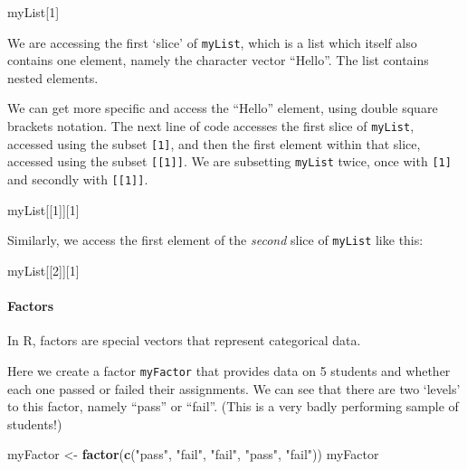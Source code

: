\documentclass[]{article}
\newenvironment{Shaded}{\begin{snugshade}}{\end{snugshade}}
\newcommand{\DecValTok}[1]{\textcolor[rgb]{0.00,0.00,0.81}{#1}}
\newcommand{\KeywordTok}[1]{\textcolor[rgb]{0.13,0.29,0.53}{\textbf{#1}}}
\newcommand{\NormalTok}[1]{#1}
\newcommand{\StringTok}[1]{\textcolor[rgb]{0.31,0.60,0.02}{#1}}
\let\oldparagraph\paragraph
\renewcommand{\paragraph}[1]{\oldparagraph{#1}\mbox{}}
\begin{document}
\begin{Shaded}
\begin{Highlighting}[]
\NormalTok{myList[}\DecValTok{1}\NormalTok{]}
\end{Highlighting}
\end{Shaded}

We are accessing the first `slice' of \texttt{myList}, which is a list
which itself also contains one element, namely the character vector
``Hello''. The list contains nested elements.

We can get more specific and access the ``Hello'' element, using double
square brackets notation. The next line of code accesses the first slice
of \texttt{myList}, accessed using the subset \texttt{{[}1{]}}, and then
the first element within that slice, accessed using the subset
\texttt{{[}{[}1{]}{]}}. We are subsetting \texttt{myList} twice, once
with \texttt{{[}1{]}} and secondly with \texttt{{[}{[}1{]}{]}}.

\begin{Shaded}
\begin{Highlighting}[]
\NormalTok{myList[[}\DecValTok{1}\NormalTok{]][}\DecValTok{1}\NormalTok{]}
\end{Highlighting}
\end{Shaded}

Similarly, we access the first element of the \emph{second} slice of
\texttt{myList} like this:

\begin{Shaded}
\begin{Highlighting}[]
\NormalTok{myList[[}\DecValTok{2}\NormalTok{]][}\DecValTok{1}\NormalTok{]}
\end{Highlighting}
\end{Shaded}

\hypertarget{factors}{%
\paragraph{Factors}\label{factors}}

In R, factors are special vectors that represent categorical data.

Here we create a factor \texttt{myFactor} that provides data on 5
students and whether each one passed or failed their assignments. We can
see that there are two `levels' to this factor, namely ``pass'' or
``fail''. (This is a very badly performing sample of students!)

\begin{Shaded}
\begin{Highlighting}[]
\NormalTok{myFactor <-}\StringTok{ }\KeywordTok{factor}\NormalTok{(}\KeywordTok{c}\NormalTok{(}\StringTok{"pass"}\NormalTok{, }\StringTok{"fail"}\NormalTok{, }\StringTok{"fail"}\NormalTok{, }\StringTok{"pass"}\NormalTok{, }\StringTok{"fail"}\NormalTok{))}
\NormalTok{myFactor}
\end{Highlighting}
\end{Shaded}
\end{document}

